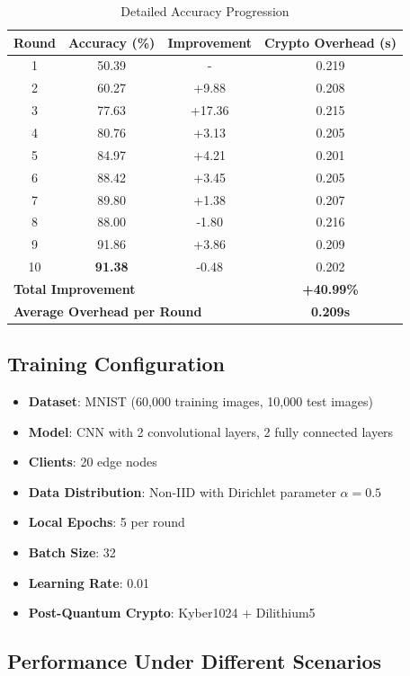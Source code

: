 \documentclass[12pt,a4paper]{article}
\begin{document}
\begin{table}[H]
\centering
\caption{Detailed Accuracy Progression}
\begin{tabular}{cccc}
\toprule
\textbf{Round} & \textbf{Accuracy (\%)} & \textbf{Improvement} & \textbf{Crypto Overhead (s)} \\
\midrule
1 & 50.39 & - & 0.219 \\
2 & 60.27 & +9.88 & 0.208 \\
3 & 77.63 & +17.36 & 0.215 \\
4 & 80.76 & +3.13 & 0.205 \\
5 & 84.97 & +4.21 & 0.201 \\
6 & 88.42 & +3.45 & 0.205 \\
7 & 89.80 & +1.38 & 0.207 \\
8 & 88.00 & -1.80 & 0.216 \\
9 & 91.86 & +3.86 & 0.209 \\
10 & \textbf{91.38} & -0.48 & 0.202 \\
\midrule
\multicolumn{3}{l}{\textbf{Total Improvement}} & \textbf{+40.99\%} \\
\multicolumn{3}{l}{\textbf{Average Overhead per Round}} & \textbf{0.209s} \\
\bottomrule
\end{tabular}
\end{table}

\subsection{Training Configuration}

\begin{itemize}
    \item \textbf{Dataset}: MNIST (60,000 training images, 10,000 test images)
    \item \textbf{Model}: CNN with 2 convolutional layers, 2 fully connected layers
    \item \textbf{Clients}: 20 edge nodes
    \item \textbf{Data Distribution}: Non-IID with Dirichlet parameter $\alpha = 0.5$
    \item \textbf{Local Epochs}: 5 per round
    \item \textbf{Batch Size}: 32
    \item \textbf{Learning Rate}: 0.01
    \item \textbf{Post-Quantum Crypto}: Kyber1024 + Dilithium5
\end{itemize}

\subsection{Performance Under Different Scenarios}
\end{document}

